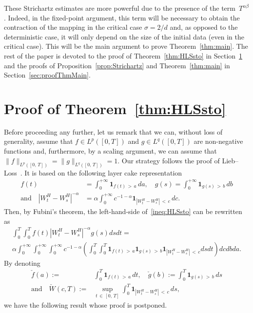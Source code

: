 \documentclass[10pt]{amsart}
\theoremstyle{definition}\newtheorem{defi}[theo]{Definition}\newtheorem{rema}[theo]{Remark}\newtheorem{exam}[theo]{Example}\newtheorem{exem}[theo]{Example}\newtheorem{nota}[theo]{Notation}
\newcommand{\bfun}{\mathbf{1}}
\begin{document}
These Strichartz estimates are more powerful due to the presence of the term~$T^{\alpha\beta}$. Indeed, in the fixed-point argument, this term will be necessary to obtain the contraction of the mapping in the critical case $\sigma = 2/d$ and, as opposed to the deterministic case, it will only depend on the size of the initial data (even in the critical case). This will be the main argument to prove Theorem~\ref{thm:main}. The rest of the paper is devoted to the proof of Theorem~\ref{thm:HLSsto} in Section~\ref{sec:proofThmHLSsto} and the proofs of Proposition~\ref{prop:Strichartz} and Theorem~\ref{thm:main} in Section~\ref{sec:proofThmMain}.

\section{Proof of Theorem~\ref{thm:HLSsto}}\label{sec:proofThmHLSsto}

Before proceeding any further, let us remark that we can, without loss of generality, assume that $f\in L^p([0,T])$ and $g\in L^q([0,T])$ are non-negative functions and, furthermore, by a scaling argument, we can assume that $\|f\|_{L^p([0,\,T])} = \|g\|_{L^q([0,\,T])} = 1$. Our strategy follows the proof of Lieb--Loss~\cite[Section~4.3]{lieb2001analysis}. It is based on the following layer cake representation
\begin{align*}
f(t) &= \int_0^{+\infty} \bfun_{f(t)\,>\,a}\,da,\quad g(s) = \int_0^{+\infty} \bfun_{g(s)\,>\,b}\,db
\\ \text{and}\quad \left|W_t^H-W_s^H\right|^{-\alpha} &= \alpha \int_0^{+\infty} c^{-1-\alpha} \bfun_{\left|W_t^H-W_s^H\right|\,<\,c}\,dc.
\end{align*}
Then, by Fubini's theorem, the left-hand-side of~\eqref{ineq:HLSsto} can be rewritten as
\begin{multline}\label{eq:ineqHLScake}
\int_0^T\int_0^T f(t)\left|W_t^H-W_s^H\right|^{-\alpha}g(s) ds dt =\\
\alpha\int_0^{+\infty}\int_0^{+\infty}\int_0^{+\infty} c^{-1-\alpha} \left(\int_0^T\int_0^T \bfun_{f(t)\,>\,a}\bfun_{g(s)\,>\,b}\bfun_{\left|W_t^H-W_s^H\right|\,<\,c} ds dt\right) dc db da.
\end{multline}
By denoting
\begin{align*}
\check{f}(a) :=& \int_0^T \bfun_{f(t)\,>\,a}\,dt,\quad\check{g}(b) := \int_0^T \bfun_{g(s)\,>\,b}\,ds\\
\text{and}\quad \check{W}(c,T) :=& \sup_{t\,\in\,[0,\,T]} \int_0^T \bfun_{\left|W_t^H-W_s^H\right|\,<\,c}\,ds,
\end{align*}
we have the following result whose proof is postponed.
\end{document}
